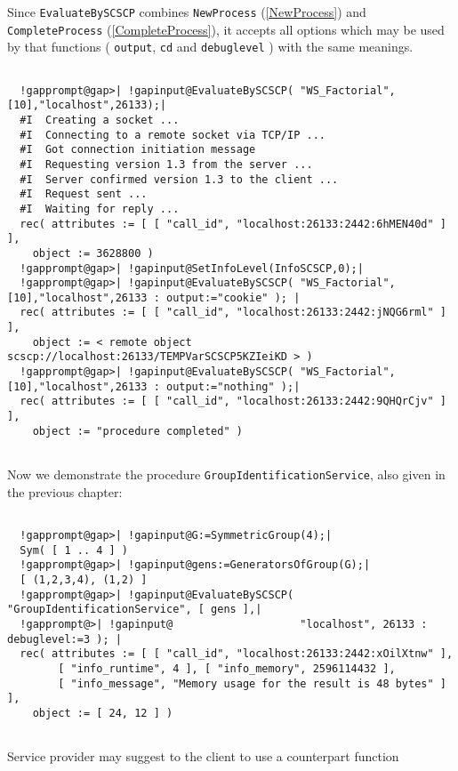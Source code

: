 \documentclass[a4paper,11pt]{report}
\begin{document}
{{{ Since \texttt{EvaluateBySCSCP} combines \texttt{NewProcess} (\ref{NewProcess}) and \texttt{CompleteProcess} (\ref{CompleteProcess}), it accepts all options which may be used by that functions ( \texttt{output}, \texttt{cd} and \texttt{debuglevel} ) with the same meanings. 
\begin{Verbatim}[commandchars=!@|,fontsize=\small,frame=single,label=Example]
  
  !gapprompt@gap>| !gapinput@EvaluateBySCSCP( "WS_Factorial",[10],"localhost",26133);|
  #I  Creating a socket ...
  #I  Connecting to a remote socket via TCP/IP ...
  #I  Got connection initiation message
  #I  Requesting version 1.3 from the server ...
  #I  Server confirmed version 1.3 to the client ...
  #I  Request sent ...
  #I  Waiting for reply ...
  rec( attributes := [ [ "call_id", "localhost:26133:2442:6hMEN40d" ] ], 
    object := 3628800 )
  !gapprompt@gap>| !gapinput@SetInfoLevel(InfoSCSCP,0);|
  !gapprompt@gap>| !gapinput@EvaluateBySCSCP( "WS_Factorial",[10],"localhost",26133 : output:="cookie" ); |
  rec( attributes := [ [ "call_id", "localhost:26133:2442:jNQG6rml" ] ], 
    object := < remote object scscp://localhost:26133/TEMPVarSCSCP5KZIeiKD > )
  !gapprompt@gap>| !gapinput@EvaluateBySCSCP( "WS_Factorial",[10],"localhost",26133 : output:="nothing" );|
  rec( attributes := [ [ "call_id", "localhost:26133:2442:9QHQrCjv" ] ], 
    object := "procedure completed" )
  
\end{Verbatim}
 }

 Now we demonstrate the procedure \texttt{GroupIdentificationService}, also given in the previous chapter: 
\begin{Verbatim}[commandchars=!@|,fontsize=\small,frame=single,label=Example]
  
  !gapprompt@gap>| !gapinput@G:=SymmetricGroup(4);|
  Sym( [ 1 .. 4 ] )
  !gapprompt@gap>| !gapinput@gens:=GeneratorsOfGroup(G);|
  [ (1,2,3,4), (1,2) ]
  !gapprompt@gap>| !gapinput@EvaluateBySCSCP( "GroupIdentificationService", [ gens ],|
  !gapprompt@>| !gapinput@                    "localhost", 26133 : debuglevel:=3 ); |
  rec( attributes := [ [ "call_id", "localhost:26133:2442:xOilXtnw" ], 
        [ "info_runtime", 4 ], [ "info_memory", 2596114432 ], 
        [ "info_message", "Memory usage for the result is 48 bytes" ] ], 
    object := [ 24, 12 ] )
  
\end{Verbatim}
 Service provider may suggest to the client to use a counterpart function 
\begin{Verbatim}[commandchars=!@|,fontsize=\small,frame=single,label=Example]
  

\end{Verbatim}}}
\end{document}
